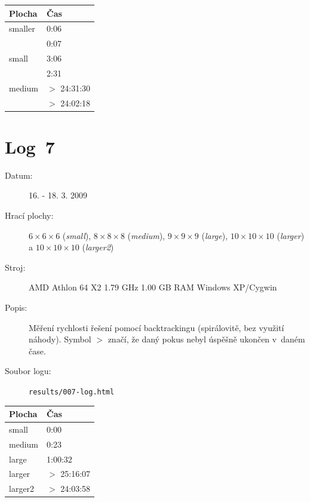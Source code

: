\documentclass[11pt, titlepage]{report}
\begin{document}
\begin{tabular}{|l|l|}
\hline
\textbf{Plocha} & \textbf{Čas} \\
\hline
smaller & 0:06 \\
& 0:07 \\
small & 3:06 \\
& 2:31 \\
medium & $>$ 24:31:30 \\
& $>$ 24:02:18 \\
\hline
\end{tabular}


\section{Log~7}
\label{log7}

\begin{description}
\item[Datum:] 16. - 18. 3. 2009
\item[Hrací plochy:] $6 \times 6 \times 6$ (\emph{small}), $8 \times 8 \times 8$ (\emph{medium}), $9 \times 9 \times 9$ (\emph{large}), $10 \times 10 \times 10$ (\emph{larger}) a $10 \times 10 \times 10$ (\emph{larger2})
\item[Stroj:] AMD Athlon 64 X2 1.79 GHz 1.00 GB RAM Windows XP/Cygwin
\item[Popis:] Měření rychlosti řešení pomocí backtrackingu (spirálovitě, bez využití náhody). Symbol $>$ značí, že daný pokus nebyl úspěšně ukončen v~daném čase.
\item[Soubor logu:] \texttt{results/007-log.html}
\end{description}

\begin{tabular}{|l|l|}
\hline
\textbf{Plocha} & \textbf{Čas} \\
\hline
small & 0:00 \\
medium & 0:23 \\
large & 1:00:32 \\
larger & $>$ 25:16:07 \\
larger2 & $>$ 24:03:58 \\
\hline
\end{tabular}
\end{document}
